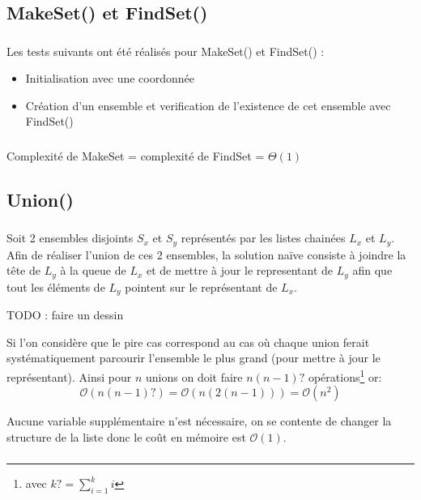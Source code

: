 \documentclass[10pt,a4paper]{article}
\renewcommand{\O}{\mathcal{O}}
\begin{document}
\subsection{MakeSet() et FindSet()}

\subsubsection{}
Les tests suivants ont été réalisés pour MakeSet() et FindSet() :
\begin{itemize}
\item Initialisation avec une coordonnée
\item Création d'un ensemble et verification de l'existence de cet ensemble avec FindSet()
\end{itemize}

\subsubsection{}
Complexité de MakeSet = complexité de FindSet = $\Theta(1)$

\subsection{Union()}
\subsubsection{}
Soit 2 ensembles disjoints $S_{x}$ et $S_{y}$ représentés par les listes chainées $L_{x}$ et $L_{y}$. Afin de réaliser l'union de ces 2 ensembles, la solution naïve consiste à joindre la tête de $L_{y}$ à la queue de $L_{x}$ et de mettre à jour le representant de $L_{y}$ afin que tout les éléments de $L_{y}$ pointent sur le représentant de $L_{x}$.

TODO : faire un dessin 

Si l'on considère que le pire cas correspond au cas où chaque union ferait systématiquement parcourir l'ensemble le plus grand (pour mettre à jour le représentant). Ainsi pour $n$ unions on doit faire $n(n-1)?$ opérations\footnote{avec $k? = \sum\limits_{i=1}^{k}{i}$} or:
\[\O(n(n-1)?) =  \O(n(2(n-1))) = \O(n^2)\]

Aucune variable supplémentaire n'est nécessaire, on se contente de changer la structure de la liste donc le coût en mémoire est $\O(1)$.
\subsubsection{}
\end{document}

